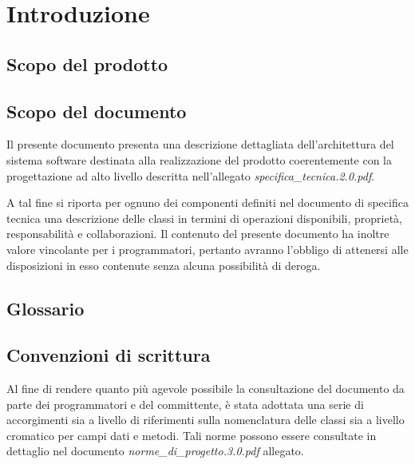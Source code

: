 

\setcounter{page}{1}
\pagestyle{normal}

\newpage

\section{Introduzione}
\subsection{Scopo del prodotto}
\purpose

\subsection{Scopo del documento}
Il presente documento presenta una descrizione dettagliata dell'architettura del sistema software destinata alla realizzazione del prodotto \caName{} coerentemente con la progettazione ad alto livello descritta nell'allegato \textit{specifica\_tecnica.2.0.pdf}.

A tal fine si riporta per ognuno dei componenti definiti nel documento di specifica tecnica una descrizione delle classi in termini di operazioni disponibili, proprietà, responsabilità e collaborazioni. Il contenuto del presente documento ha inoltre valore vincolante per i programmatori, pertanto avranno l'obbligo di attenersi alle disposizioni in esso contenute senza alcuna possibilità di deroga.

\subsection{Glossario}
\glossaryIntro

\subsection{Convenzioni di scrittura}
Al fine di rendere quanto più agevole possibile la consultazione del documento da parte dei programmatori e del committente, è stata adottata una serie di accorgimenti sia a livello di riferimenti sulla nomenclatura delle classi sia a livello cromatico per campi dati e metodi. 
Tali norme possono essere consultate in dettaglio nel documento \textit{norme\_di\_progetto.3.0.pdf} allegato.
\clearpage

